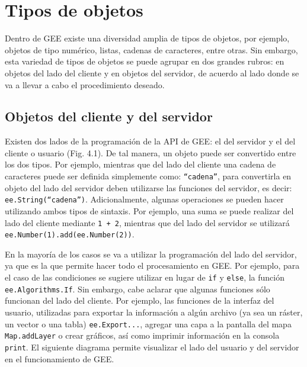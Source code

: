 \documentclass[
  12pt,
  letterpaper,
  twoside]{book}
\begin{document}
\newpage

\hypertarget{tipos-de-objetos}{%
\chapter{Tipos de objetos}\label{tipos-de-objetos}}

Dentro de GEE existe una diversidad amplia de tipos de objetos, por ejemplo, objetos de tipo numérico, listas, cadenas de caracteres, entre otras. Sin embargo, esta variedad de tipos de objetos se puede agrupar en dos grandes rubros: en objetos del lado del cliente y en objetos del servidor, de acuerdo al lado donde se va a llevar a cabo el procedimiento deseado.

\hypertarget{objetos-del-cliente-y-del-servidor}{%
\section{Objetos del cliente y del servidor}\label{objetos-del-cliente-y-del-servidor}}

Existen dos lados de la programación de la API de GEE: el del servidor y el del cliente o usuario (Fig. 4.1). De tal manera, un objeto puede ser convertido entre los dos tipos. Por ejemplo, mientras que del lado del cliente una cadena de caracteres puede ser definida simplemente como: \texttt{“cadena”}, para convertirla en objeto del lado del servidor deben utilizarse las funciones del servidor, es decir: \texttt{ee.String(“cadena”)}. Adicionalmente, algunas operaciones se pueden hacer utilizando ambos tipos de sintaxis. Por ejemplo, una suma se puede realizar del lado del cliente mediante \texttt{1\ +\ 2}, mientras que del lado del servidor se utilizará \texttt{ee.Number(1).add(ee.Number(2))}.

En la mayoría de los casos se va a utilizar la programación del lado del servidor, ya que es la que permite hacer todo el procesamiento en GEE. Por ejemplo, para el caso de las condiciones se sugiere utilizar en lugar de \texttt{if} y \texttt{else}, la función \texttt{ee.Algorithms.If}. Sin embargo, cabe aclarar que algunas funciones sólo funcionan del lado del cliente. Por ejemplo, las funciones de la interfaz del usuario, utilizadas para exportar la información a algún archivo (ya sea un ráster, un vector o una tabla) \texttt{ee.Export...}, agregar una capa a la pantalla del mapa \texttt{Map.addLayer} o crear gráficos, así como imprimir información en la consola \texttt{print}. El siguiente diagrama permite visualizar el lado del usuario y del servidor en el funcionamiento de GEE.
\end{document}

